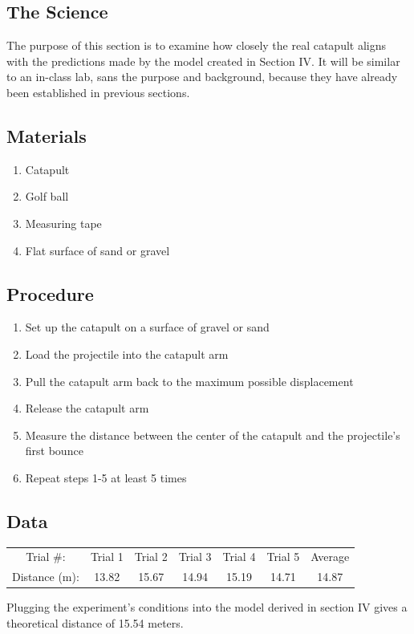 \documentclass[10pt]{article}
\begin{document}
  \begin{flushleft}
  \section{The Science}
    
    The purpose of this section is to examine how closely the real catapult aligns with the predictions made by the model created in Section IV. 
    It will be similar to an in-class lab, sans the purpose and background, because they have already been established in previous sections.
    
    \subsection{Materials}
      \begin{enumerate}
        \item Catapult
        \item Golf ball
        \item Measuring tape
        \item Flat surface of sand or gravel
      \end{enumerate} 

    \subsection{Procedure}
      \begin{enumerate}
        \item Set up the catapult on a surface of gravel or sand
        \item Load the projectile into the catapult arm
        \item Pull the catapult arm back to the maximum possible displacement
        \item Release the catapult arm
        \item Measure the distance between the center of the catapult and the projectile's first bounce
        \item Repeat steps 1-5 at least 5 times
      \end{enumerate}

    \subsection{Data}   
    
      \begin{center}
      \begin{tabular}{ |c|c|c|c|c|c|c| } 
       \hline
             Trial \#: & Trial 1 & Trial 2 & Trial 3 & Trial 4 & Trial 5 & Average \\ 
             Distance (m): & 13.82 & 15.67 & 14.94 & 15.19 & 14.71 & 14.87 \\ 
       \hline
      \end{tabular}
      \end{center}

      Plugging the experiment's conditions into the model derived in section IV gives a theoretical distance of 15.54 meters.

\end{flushleft}
\end{document}
